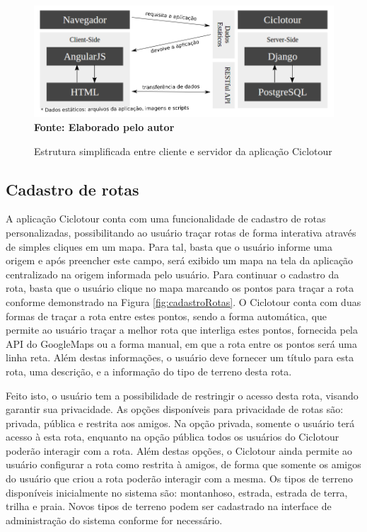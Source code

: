 \begin{figure}[!ht]
	\centering	
	\caption[\hspace{0.1cm} Estrutura simplificada entre cliente e servidor da aplicação Ciclotour.]
	{Estrutura simplificada entre cliente e servidor da aplicação Ciclotour}
	  \vspace{-0.4cm}
	\includegraphics[width=1\textwidth]{figuras/estruturaCiclotour.png}
	 \vspace{-0.3cm}
	\\\textbf{\footnotesize Fonte: Elaborado pelo autor}
	\label{fig:estruturaCiclotour}
\end{figure}

\subsection{Cadastro de rotas}
A aplicação Ciclotour conta com uma funcionalidade de cadastro de rotas personalizadas, possibilitando ao usuário traçar rotas de forma interativa 
através de simples cliques em um mapa. Para tal, basta que o usuário informe uma origem e após preencher este campo, será exibido um mapa na 
tela da aplicação centralizado na origem informada pelo usuário. Para continuar o cadastro da rota, basta que o usuário clique no mapa marcando os 
pontos para traçar a rota conforme demonstrado na Figura \ref{fig:cadastroRotas}. O Ciclotour conta com duas formas de traçar a rota entre estes 
pontos, sendo a forma automática, que permite ao usuário traçar a melhor rota que interliga estes pontos, fornecida pela API do GoogleMaps ou a 
forma manual, em que a rota entre os pontos será uma linha reta. Além destas informações, o usuário deve fornecer um título para esta rota, uma 
descrição, e a informação do tipo de terreno desta rota. 

Feito isto, o usuário tem a possibilidade de restringir o acesso desta rota, visando garantir sua privacidade. As opções disponíveis para privacidade de 
rotas são: privada, pública e restrita aos amigos. Na opção privada, somente o usuário terá acesso à esta rota, enquanto na opção pública todos os 
usuários do Ciclotour poderão interagir com a rota. Além destas opções, o Ciclotour ainda permite ao usuário configurar a rota como restrita à amigos, 
de forma que somente os amigos do usuário que criou a rota poderão interagir com a mesma. Os tipos de terreno disponíveis inicialmente no sistema 
são: montanhoso, estrada, estrada de terra, trilha e praia. Novos tipos de terreno podem ser cadastrado na interface de administração do sistema 
conforme for necessário.

